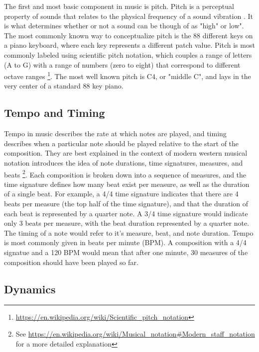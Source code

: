 \begin{appendices}
The first and most basic component in music is pitch. Pitch is a perceptual property of sounds that relates to the physical frequency of a sound vibration \cite{klapuri2006introduction}. It is what determines whether or not a sound can be though of as "high" or low". The most commonly known way to conceptualize pitch is the 88 different keys on a piano keyboard, where each key represents a different patch value. Pitch is most commonly labeled using scientific pitch notation, which couples a range of letters (A to G) with a range of numbers (zero to eight) that correspond to different octave ranges \footnote{\url{https://en.wikipedia.org/wiki/Scientific_pitch_notation}}. The most well known pitch is C4, or "middle C", and lays in the very center of a standard 88 key piano. 

\subsection{Tempo and Timing}

Tempo in music describes the rate at which notes are played, and timing describes when a particular note should be played relative to the start of the composition. They are best explained in the context of modern western musical notation introduces the idea of note durations, time signatures, measures, and beats \footnote{See \url{https://en.wikipedia.org/wiki/Musical_notation\#Modern_staff_notation} for a more detailed explanation}.  Each composition is broken down into a sequence of measures, and the time signature defines how many beat exist per measure, as well as the duration of a single beat. For example, a 4/4 time signature indicates that there are 4 beats per measure (the top half of the time signature), and that the duration of each beat is represented by a quarter note. A 3/4 time signature would indicate only 3 beats per measure, with the beat duration represented by a quarter note. The timing of a note would refer to it's measure, beat, and note duration. Tempo is most commonly given in beats per minute (BPM). A composition with a 4/4 signatue and a 120 BPM would mean that after one minute, 30 measures of the composition should have been played so far. 

\subsection{Dynamics}


\end{appendices}
